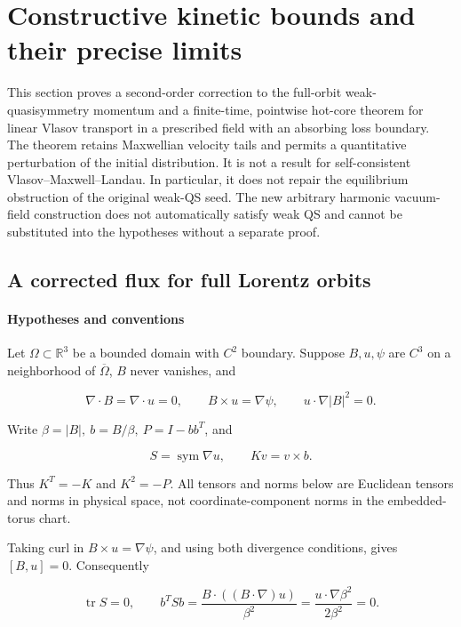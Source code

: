 \section{Constructive kinetic bounds and their precise
limits}\label{constructive-kinetic-bounds-and-their-precise-limits}

This section proves a second-order correction to the full-orbit
weak-quasisymmetry momentum and a finite-time, pointwise hot-core
theorem for linear Vlasov transport in a prescribed field with an
absorbing loss boundary. The theorem retains Maxwellian velocity tails
and permits a quantitative perturbation of the initial distribution. It
is not a result for self-consistent Vlasov--Maxwell--Landau. In
particular, it does not repair the equilibrium obstruction of the
original weak-QS seed. The new arbitrary harmonic vacuum-field
construction does not automatically satisfy weak QS and cannot be
substituted into the hypotheses without a separate proof.

\subsection{A corrected flux for full Lorentz
orbits}\label{a-corrected-flux-for-full-lorentz-orbits}

\paragraph{Hypotheses and
conventions}\label{hypotheses-and-conventions}

Let \(\Omega\subset\mathbb R^3\) be a bounded domain with \(C^2\)
boundary. Suppose \(B,u,\psi\) are \(C^3\) on a neighborhood of
\(\overline\Omega\), \(B\) never vanishes, and

\[
\nabla\cdot B=\nabla\cdot u=0,\qquad
B\times u=\nabla\psi,\qquad u\cdot\nabla |B|^2=0.
\tag{Q1}
\]

Write \(\beta=|B|,\ b=B/\beta,\ P=I-bb^T\), and

\[
S=\operatorname{sym}\nabla u,\qquad
K v=v\times b.
\]

Thus \(K^T=-K\) and \(K^2=-P\). All tensors and norms below are
Euclidean tensors and norms in physical space, not coordinate-component
norms in the embedded-torus chart.

Taking curl in \(B\times u=\nabla\psi\), and using both divergence
conditions, gives \([B,u]=0\). Consequently

\[
\operatorname{tr}S=0,\qquad
b^TSb=\frac{B\cdot((B\cdot\nabla)u)}{\beta^2}
     =\frac{u\cdot\nabla\beta^2}{2\beta^2}=0.
\tag{Q2}
\]

